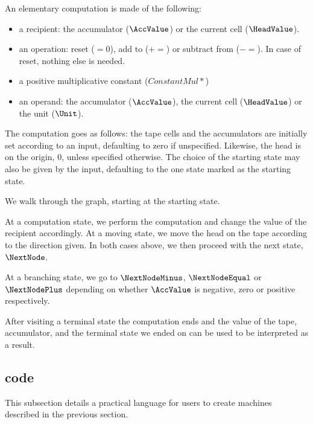 An elementary computation is made of the following:
\begin{itemize}
	\item a recipient: the accumulator ($\AccValue$) or the current cell ($\HeadValue$).
	\item an operation: reset ($=0$), add to ($+=$) or subtract from ($-=$).
	In case of reset, nothing else is needed.
	\item a positive multiplicative constant ($ConstantMul *$)
	\item an operand: the accumulator ($\AccValue$), the current cell ($\HeadValue$) or the unit ($\Unit$).
\end{itemize}

The computation goes as follows: the tape cells and the accumulators are initially set according to an input, defaulting to zero if unspecified.
Likewise, the head is on the origin, $0$, unless specified otherwise.
The choice of the starting state may also be given by the input, defaulting to the one state marked as the starting state.

We walk through the graph, starting at the starting state.

At a computation state, we perform the computation and change the value of the recipient accordingly.
At a moving state, we move the head on the tape according to the direction given.
In both cases above, we then proceed with the next state, $\NextNode$.
%

At a branching state, we go to $\NextNodeMinus$, $\NextNodeEqual$ or $\NextNodePlus$ depending on whether $\AccValue$ is negative, zero or positive respectively.

After visiting a terminal state%
the computation ends and the value of the tape, accumulator, and the terminal state we ended on can be used to be interpreted as a result.


\subsection{code}

This subsection details a practical language for users to create machines described in the previous section.


